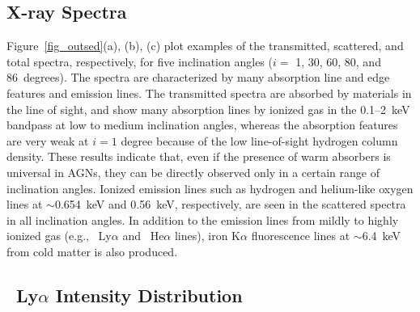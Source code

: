 \documentclass[twocolumn,times,twocolappendix]{aastex63}
\begin{document}
\subsection{X-ray Spectra}


\begin{figure*}
\caption{
The simulated X-ray spectral models
in units of $\nu f_\nu$ for inclinations of $i=$ 1, 30, 60, 80, and 86~degrees, from top to bottom.
(a): The transmitted spectra (attenuated incident radiation).
(b): The scattered spectra, which contains Compton scattered incident radiation and diffuse emission from all the cells.
(c): The total (transmitted + scattered) spectra.
}
\label{fig_outsed}
\end{figure*}

Figure~\ref{fig_outsed}(a), (b), (c) plot examples of the
transmitted, scattered, and total spectra, respectively, for five
inclination angles ($i=$ 1, 30, 60, 80, and 86~degrees). The spectra are
characterized by many absorption line and edge features and emission
lines. The transmitted spectra are absorbed by materials in the line
of sight, and show many absorption lines by ionized gas in the
0.1--2~keV bandpass at low to medium inclination angles, whereas the
absorption features are very weak at
$i=1$ degree
because of the low
line-of-sight hydrogen column density. 
These results indicate
that, even if the presence of warm absorbers is universal in AGNs,
they can be directly observed only in a certain range of inclination angles.
Ionized emission lines such as
hydrogen and helium-like oxygen lines at $\sim$0.654~keV and 0.56~keV,
respectively, are seen in the scattered spectra in all inclination
angles.
In addition to the emission lines from mildly to highly ionized gas (e.g., ~Ly$\alpha$ and ~He$\alpha$ lines), 
iron K$\alpha$ fluorescence lines at $\sim$6.4~keV from cold matter is
also produced.


\subsection{~Ly$\alpha$ Intensity Distribution}


\begin{figure*}
\caption{
(a): Surface brightness distribution of ~Ly$\alpha$ at 0.654~keV for the inclination angle $i = 0^\circ$. 
(b): Same as (a) but for $i = 30^\circ$. 
}
\label{fig-map}
\end{figure*}
\end{document}
